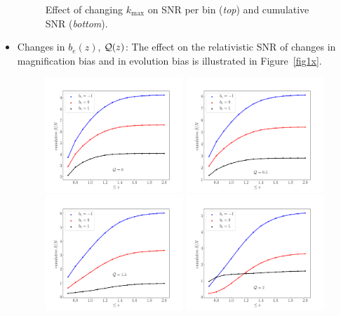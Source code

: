 \begin{itemize}
\begin{figure}[!ht]
\caption{Effect of changing $k_{\mathrm{max}}$ on SNR per bin ({\em top}) and cumulative SNR ({\em bottom}).} \label{kmsnr}
\end{figure} 
\item  
Changes in $b_e(z)$, $\mathcal{Q}(z)$: 
The effect on the relativistic SNR of changes in magnification bias and in evolution bias is illustrated in Figure~\ref{fig1x}.
\begin{figure}[!ht]
\centering
\includegraphics[width=0.49\textwidth]{fig/cumulativeSnrdopplerQ0_0-eps-converted-to} 
\includegraphics[width=0.49\textwidth]{fig/cumulativeSnrdopplerQ0_5-eps-converted-to} \\
\includegraphics[width=0.49\textwidth]{fig/cumulativeSnrdopplerQ1_5-eps-converted-to}
\includegraphics[width=0.49\textwidth]{fig/cumulativeSnrdopplerQ2_0-eps-converted-to} 

\end{figure}
\end{itemize}
